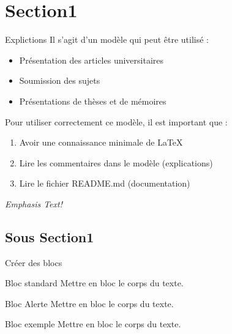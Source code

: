 \documentclass{libs/udl_format}
\begin{document}
\section{Section1}
\begin{frame}{Explictions}
    Il s'agit d'un modèle qui peut être utilisé :
    \begin{itemize}
        \item Présentation des articles universitaires
        \item Soumission des sujets
        \item Présentations de thèses et de mémoires
    \end{itemize}

    \vspace{0.4cm} %
    
    
        Pour utiliser correctement ce modèle, il est important que :
      \begin{enumerate}
        \item Avoir une connaissance minimale de LaTeX
        \item Lire les commentaires dans le modèle (explications)
        \item Lire le fichier README.md (documentation)
    \end{enumerate}

    \vspace{0.2cm}
 \emph{Emphasis Text!}
    
\end{frame}

\subsection{Sous Section1}
\begin{frame}{Créer des blocs}
    \begin{block}{Bloc standard}
        Mettre en bloc le corps du texte.
    \end{block}

    \begin{alertblock}{Bloc Alerte}
        Mettre en bloc le corps du texte.
    \end{alertblock}

    \begin{exampleblock}{Bloc exemple}
         Mettre en bloc le corps du texte.
    \end{exampleblock}   
\end{frame}
\end{document}

